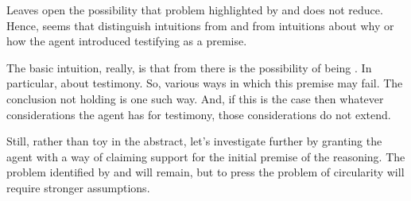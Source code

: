 \begin{note}




  Leaves open the possibility that problem highlighted by \ideaCSA{} and \ideaCSB{} does not reduce.
  Hence, seems that distinguish intuitions from \ideaCSA{} and \ideaCSB{} from intuitions about why or how the agent introduced  testifying as a premise.
\end{note}

\begin{note}
  The basic intuition, really, is that from \ideaCSA{} there is the possibility of being \mom{}.
  In particular, \mistaken{} about testimony.
  So, various ways in which this premise may fail.
  The conclusion not holding is one such way.
  And, if this is the case then whatever considerations the agent has for testimony, those considerations do not extend.
\end{note}

\begin{note}
  Still, rather than toy in the abstract, let's investigate further by granting the agent with a way of claiming support for the initial premise of the reasoning.
  The problem identified by \ideaCSA{} and \ideaCSB{} will remain, but to press the problem of circularity will require stronger assumptions.
\end{note}


